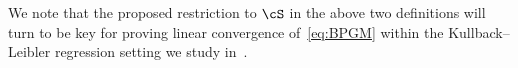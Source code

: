 \documentclass[11pt]{amsart}
\newcommand{\es}[1]{{\color{blue}#1}}
\newcommand{\jc}[1]{{\color{red}#1}}
\begin{document}
We note that the proposed restriction to $\cS$ in the above two definitions will turn to be key for proving linear convergence of~\cref{eq:BPGM} within the Kullback--Leibler regression setting we study in~.
\end{document}
